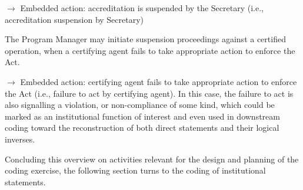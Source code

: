 {\begin{minipage}{15.5cm}
$\rightarrow$ Embedded action: accreditation is suspended by the Secretary (i.e., accreditation suspension by Secretary)

\begin{exa}The Program Manager may initiate suspension proceedings against a certified operation, when a certifying agent fails to take appropriate action to enforce the Act.\end{exa}

$\rightarrow$ Embedded action: certifying agent fails to take appropriate action to enforce the Act (i.e., failure to act by certifying agent). In this case, the failure to act is also signalling a violation, or non-compliance of some kind, which could be marked as an institutional function of interest and even used in downstream coding toward the reconstruction of both direct statements and their logical inverses. 

\end{minipage}}

\sp

Concluding this overview on activities relevant for the design and planning of the coding exercise, the following section turns to the coding of institutional statements. 

\newpage

